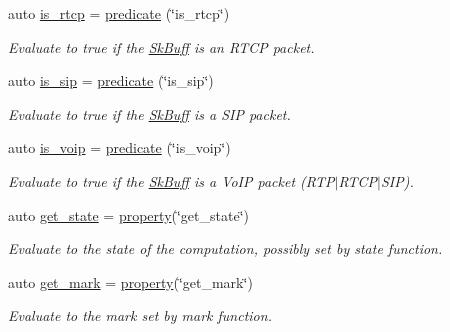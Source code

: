 \begin{DoxyCompactItemize}
auto \hyperlink{namespacepfq_1_1lang_1_1anonymous__namespace_02default_8hpp_03_a2cbe73f955007e35d4a627c2cfb38566}{is\+\_\+rtcp} = \hyperlink{namespacepfq_1_1lang_aca9adafc436b7f851621b979fa1aaf88}{predicate} (\char`\"{}is\+\_\+rtcp\char`\"{})
\begin{DoxyCompactList}\small\item\em Evaluate to {\ttfamily true} if the \hyperlink{structpfq_1_1lang_1_1SkBuff}{Sk\+Buff} is an R\+T\+CP packet. \end{DoxyCompactList}\item 
auto \hyperlink{namespacepfq_1_1lang_1_1anonymous__namespace_02default_8hpp_03_a8be76da99d48c27e0377a7b32e1b5d7d}{is\+\_\+sip} = \hyperlink{namespacepfq_1_1lang_aca9adafc436b7f851621b979fa1aaf88}{predicate} (\char`\"{}is\+\_\+sip\char`\"{})
\begin{DoxyCompactList}\small\item\em Evaluate to {\ttfamily true} if the \hyperlink{structpfq_1_1lang_1_1SkBuff}{Sk\+Buff} is a S\+IP packet. \end{DoxyCompactList}\item 
auto \hyperlink{namespacepfq_1_1lang_1_1anonymous__namespace_02default_8hpp_03_a79aa9beec811d735d03b40f85b4773c5}{is\+\_\+voip} = \hyperlink{namespacepfq_1_1lang_aca9adafc436b7f851621b979fa1aaf88}{predicate} (\char`\"{}is\+\_\+voip\char`\"{})
\begin{DoxyCompactList}\small\item\em Evaluate to {\ttfamily true} if the \hyperlink{structpfq_1_1lang_1_1SkBuff}{Sk\+Buff} is a Vo\+IP packet (R\+T\+P$\vert$\+R\+T\+C\+P$\vert$\+S\+IP). \end{DoxyCompactList}\item 
auto \hyperlink{namespacepfq_1_1lang_1_1anonymous__namespace_02default_8hpp_03_acd2598e95a0ebc3c21e84f9c861d0d98}{get\+\_\+state} = \hyperlink{namespacepfq_1_1lang_a1249450e72229273b0db707a286aea91}{property}(\char`\"{}get\+\_\+state\char`\"{})
\begin{DoxyCompactList}\small\item\em Evaluate to the state of the computation, possibly set by {\ttfamily state} function. \end{DoxyCompactList}\item 
auto \hyperlink{namespacepfq_1_1lang_1_1anonymous__namespace_02default_8hpp_03_ab733e24b3ca86450bea0b0888a6327d2}{get\+\_\+mark} = \hyperlink{namespacepfq_1_1lang_a1249450e72229273b0db707a286aea91}{property}(\char`\"{}get\+\_\+mark\char`\"{})
\begin{DoxyCompactList}\small\item\em Evaluate to the mark set by {\ttfamily mark} function. \end{DoxyCompactList}\item 

\end{DoxyCompactItemize}
